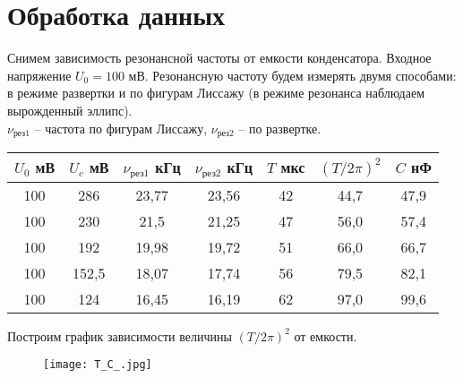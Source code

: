 





    
    
    \section{Обработка данных}
	
	
	Снимем зависимость резонансной частоты от емкости конденсатора. Входное напряжение $U_0 = 100$ мВ. Резонансную частоту будем измерять двумя способами: в режиме развертки и по фигурам Лиссажу (в режиме резонанса наблюдаем вырожденный эллипс).\\
	$\nu_{\text{рез1}}$ -- частота по фигурам Лиссажу, $\nu_{\text{рез2}}$ -- по развертке.
	
	\begin{table}[h!]
		\begin{center}
			\begin{tabular}{|c|c|c|c|c|c|c|}
				\hline
				$U_0$ мВ & $U_c$ мВ & $\nu_{\text{рез1}}$ кГц & $\nu_{\text{рез2}}$ кГц & $T$ мкс & $(T/2 \pi)^2$ & $C$ нФ \\ \hline
				100      & 286      & 23,77                   & 23,56                   & 42      & 44,7          & 47,9   \\ \hline
				100      & 230      & 21,5                    & 21,25                   & 47      & 56,0          & 57,4   \\ \hline
				100      & 192      & 19,98                   & 19,72                   & 51      & 66,0          & 66,7   \\ \hline
				100      & 152,5    & 18,07                   & 17,74                   & 56      & 79,5          & 82,1   \\ \hline
				100      & 124      & 16,45                   & 16,19                   & 62      & 97,0          & 99,6   \\ \hline
			\end{tabular}
		\end{center}
	\end{table}
	
	Построим график зависимости величины $(T/2 \pi)^2$ от емкости.
	
	\begin{figure}[h!]
		\centering
		\texttt{[image: T\_C\_.jpg]}
		\caption{}
	\end{figure}
	
